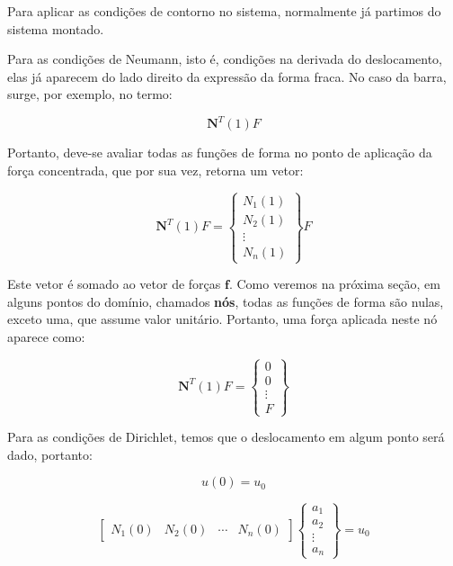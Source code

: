         Para aplicar as condições de contorno no sistema, normalmente já partimos do sistema montado.

        Para as condições de Neumann, isto é, condições na derivada do deslocamento, elas já aparecem do lado direito da expressão da forma fraca. No caso da barra, surge, por exemplo, no termo:

        \begin{equation}
            \mathbf{N}^T(1) F
        \end{equation}

        Portanto, deve-se avaliar todas as funções de forma no ponto de aplicação da força concentrada, que por sua vez, retorna um vetor:

        \begin{equation}
            \mathbf{N}^T(1) F = \begin{Bmatrix}
                N_1(1)\\
                N_2(1)\\
                \vdots\\
                N_n(1)
            \end{Bmatrix}
            F
        \end{equation}

        Este vetor é somado ao vetor de forças $\mathbf{f}$. Como veremos na próxima seção, em alguns pontos do domínio, chamados \textbf{nós}, todas as funções de forma são nulas, exceto uma, que assume valor unitário. Portanto, uma força aplicada neste nó aparece como:

        \begin{equation}
            \mathbf{N}^T(1) F = \begin{Bmatrix}
                0\\
                0\\
                \vdots\\
                F
            \end{Bmatrix}
        \end{equation}

        Para as condições de Dirichlet, temos que o deslocamento em algum ponto será dado, portanto:

        \begin{equation*}
            u(0) = u_0
        \end{equation*}

        \begin{equation*}
             \begin{bmatrix}
                N_1(0) & 
                N_2(0) &
                \cdots&
                N_n(0)
            \end{bmatrix}
            \begin{Bmatrix}
                a_1 \\ 
                a_2 \\
                \vdots\\
                a_n
            \end{Bmatrix}  = u_0
        \end{equation*}

